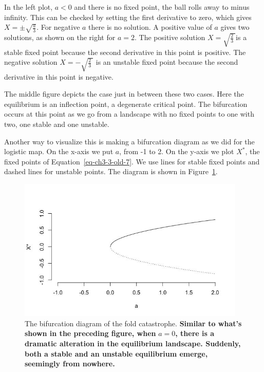 \documentclass[
  letterpaper,
]{scrbook}
\begin{document}
In the left plot, \(a < 0\) and there is no fixed point, the ball rolls
away to minus infinity. This can be checked by setting the first
derivative to zero, which gives \(X = \pm \sqrt{\frac{a}{3}}\). For
negative \(a\) there is no solution. A positive value of \(a\) gives two
solutions, as shown on the right for \(a = 2\). The positive solution
\(X = \sqrt{\frac{2}{3}\ }\)is a stable fixed point because the second
derivative in this point is positive. The negative solution
\(X = - \sqrt{\frac{2}{3}\ }\) is an unstable fixed point because the
second derivative in this point is negative.

The middle figure depicts the case just in between these two cases. Here
the equilibrium is an inflection point, a degenerate critical point. The
bifurcation occurs at this point as we go from a landscape with no fixed
points to one with two, one stable and one unstable.

Another way to visualize this is making a bifurcation diagram as we did
for the logistic map. On the x-axis we put \(a\), from -1 to 2. On the
y-axis we plot \(X^{*}\), the fixed points of
Equation~\ref{eq-ch3-3-old-7}. We use lines for stable fixed points and
dashed lines for unstable points. The diagram is shown in
Figure~\ref{fig-ch3-img5-old-17}.

\begin{figure}

{\centering \includegraphics[width=4.27778in,height=2.68056in]{media/ch3/image5.jpg}

}

\caption{\label{fig-ch3-img5-old-17}The bifurcation diagram of the fold
catastrophe. \textbf{Similar to what's shown in the preceding figure,
when} \(a=0\)\textbf{, there is a dramatic alteration in the equilibrium
landscape. Suddenly, both a stable and an unstable equilibrium emerge,
seemingly from nowhere.}}

\end{figure}
\end{document}
